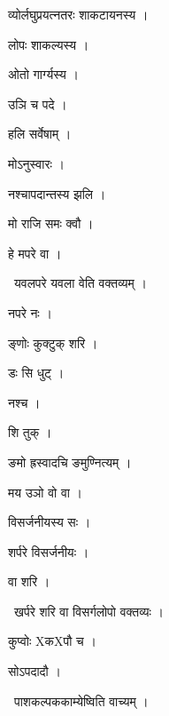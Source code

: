 \documentclass[10pt, openany, oneside]{book}
\begin{document}
\noindent व्योर्लघुप्रयत्नतरः शाकटायनस्य ।

\noindent लोपः शाकल्यस्य ।

\noindent ओतो गार्ग्यस्य ।

\noindent उञि च पदे ।

\noindent हलि सर्वेषाम् ।

\noindent मोऽनुस्वारः ।

\noindent नश्चापदान्तस्य झलि ।

\noindent मो राजि समः क्वौ ।

\noindent हे मपरे वा ।

\par\noindent\hspace{1.5em}{\vps वा॰}~{\qt यवलपरे यवला वेति वक्तव्यम् ।}

\noindent नपरे नः ।

\noindent ङ्णोः कुक्टुक् शरि ।

\noindent डः सि धुट् ।

\noindent नश्च ।

\noindent शि तुक् ।

\noindent ङमो ह्रस्वादचि ङमुण्नित्यम् ।

\noindent मय उञो वो वा ।

\noindent विसर्जनीयस्य सः ।

\noindent शर्परे विसर्जनीयः ।

\noindent वा शरि ।

\par\noindent\hspace{1.5em}{\vps वा॰}~{\qt खर्परे शरि वा विसर्गलोपो वक्तव्यः ।}

\noindent कुप्वोः XकXपौ च ।

\noindent सोऽपदादौ ।

\par\noindent\hspace{1.5em}{\vps वा॰}~{\qt पाशकल्पककाम्येष्विति वाच्यम् ।}
\end{document}
